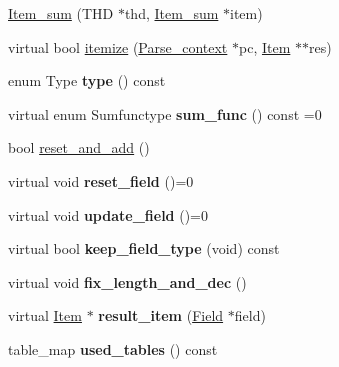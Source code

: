 \begin{DoxyCompactItemize}
\item 
\mbox{\hyperlink{classItem__sum_ab22d52290db63c5048f1aa712be2cad7}{Item\+\_\+sum}} (T\+HD $\ast$thd, \mbox{\hyperlink{classItem__sum}{Item\+\_\+sum}} $\ast$item)
\item 
virtual bool \mbox{\hyperlink{classItem__sum_ab44941149d918895e5f58ae94d3cd909}{itemize}} (\mbox{\hyperlink{structParse__context}{Parse\+\_\+context}} $\ast$pc, \mbox{\hyperlink{classItem}{Item}} $\ast$$\ast$res)
\item 
\mbox{\label{classItem__sum_a5b8e6e36d44d293008328ba1ee68603b}} 
enum Type {\bfseries type} () const
\item 
\mbox{\label{classItem__sum_aed1d2a2c7b4239179501cf8077ad4c3d}} 
virtual enum Sumfunctype {\bfseries sum\+\_\+func} () const =0
\item 
bool \mbox{\hyperlink{classItem__sum_a5d29c1ad81ae5e0193775cb360f4a74a}{reset\+\_\+and\+\_\+add}} ()
\item 
\mbox{\label{classItem__sum_a8389f10b8d24086cf3a3177b40b84378}} 
virtual void {\bfseries reset\+\_\+field} ()=0
\item 
\mbox{\label{classItem__sum_a6b214bf6962a21455aaa537f5833e226}} 
virtual void {\bfseries update\+\_\+field} ()=0
\item 
\mbox{\label{classItem__sum_a4df4292b37087da6985283709a40f80d}} 
virtual bool {\bfseries keep\+\_\+field\+\_\+type} (void) const
\item 
\mbox{\label{classItem__sum_a2d853210c9caea36d360ad57fb6b3832}} 
virtual void {\bfseries fix\+\_\+length\+\_\+and\+\_\+dec} ()
\item 
\mbox{\label{classItem__sum_a0d3f5893bf56f30e06bc88684ce00e89}} 
virtual \mbox{\hyperlink{classItem}{Item}} $\ast$ {\bfseries result\+\_\+item} (\mbox{\hyperlink{classField}{Field}} $\ast$field)
\item 
\mbox{\label{classItem__sum_ad128a276280e0afe72ccb0e393dab235}} 
table\+\_\+map {\bfseries used\+\_\+tables} () const
\item 
\mbox{\label{classItem__sum_aaab945bdb327a02540a0b9c6030ff026}} 
$$
\end{DoxyCompactItemize}
